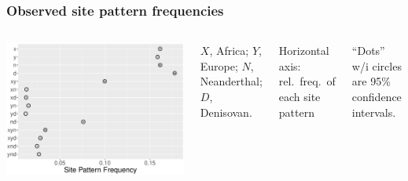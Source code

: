 \documentclass[pdftex,12pt]{beamer}
\begin{document}
\begin{frame}
  \frametitle{Observed site pattern frequencies}
  \begin{columns}
    \includegraphics[width=\linewidth]{xynd-frq.pdf}
    \raggedleft

    $X$, Africa; $Y$, Europe; $N$, Neanderthal; $D$, Denisovan.

    \bigskip

    Horizontal axis: rel.\ freq.\ of each site pattern

    \bigskip

    ``Dots'' w/i circles are 95\% confidence intervals.
  \end{columns}
\end{frame}
\end{document}
